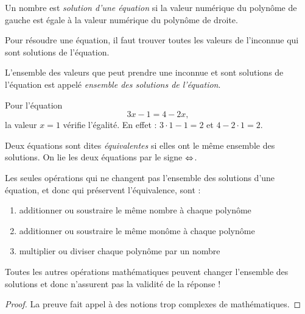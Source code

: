 \begin{definition}
Un nombre est \emph{solution d'une équation} si la valeur numérique du polynôme de gauche est égale à la valeur numérique du polynôme de droite.
\end{definition}

\begin{definition}
Pour résoudre une équation, il faut trouver toutes les valeurs de l'inconnue qui sont solutions de l'équation.

L'ensemble des valeurs que peut prendre une inconnue et sont solutions de l'équation est appelé \emph{ensemble des solutions de l'équation}.
\end{definition}

\begin{exemple}
Pour l'équation
$$
3x-1 = 4-2x,
$$
la valeur $x=1$ vérifie l'égalité. En effet : $3 \cdot 1 - 1 = 2$ et $4-2\cdot 1 = 2$.
\end{exemple}

\begin{definition}
Deux équations sont dites \emph{équivalentes} si elles ont le même ensemble des solutions. On lie les deux équations par le signe $\Leftrightarrow$.
\end{definition}

\begin{theoreme}
Les seules opérations qui ne changent pas l'ensemble des solutions d'une équation, et donc qui préservent l'équivalence,  sont :
\begin{enumerate}
\item additionner ou soustraire le même nombre à chaque polynôme
\item additionner ou soustraire le même monôme à chaque polynôme
\item multiplier ou diviser chaque polynôme par un nombre
\end{enumerate}
Toutes les autres opérations mathématiques peuvent changer l'ensemble des solutions et donc n'assurent pas la validité de la réponse !
\end{theoreme}

\begin{proof}
La preuve fait appel à des notions trop complexes de mathématiques.
\end{proof}

